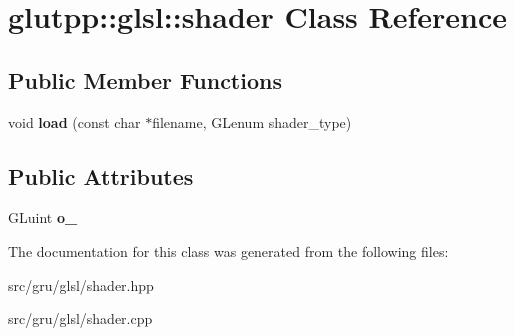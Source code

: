 \hypertarget{classglutpp_1_1glsl_1_1shader}{\section{glutpp\-:\-:glsl\-:\-:shader \-Class \-Reference}
\label{classglutpp_1_1glsl_1_1shader}
}
\subsection*{\-Public \-Member \-Functions}
\begin{DoxyCompactItemize}
\item 
\hypertarget{classglutpp_1_1glsl_1_1shader_a661319769ee74bc8ee182f00083c80ac}{void {\bfseries load} (const char $\ast$filename, \-G\-Lenum shader\-\_\-type)}\label{classglutpp_1_1glsl_1_1shader_a661319769ee74bc8ee182f00083c80ac}

\end{DoxyCompactItemize}
\subsection*{\-Public \-Attributes}
\begin{DoxyCompactItemize}
\item 
\hypertarget{classglutpp_1_1glsl_1_1shader_ad8049417565860b1b5d51171c6ace8dd}{\-G\-Luint {\bfseries o\-\_\-}}\label{classglutpp_1_1glsl_1_1shader_ad8049417565860b1b5d51171c6ace8dd}

\end{DoxyCompactItemize}


\-The documentation for this class was generated from the following files\-:\begin{DoxyCompactItemize}
\item 
src/gru/glsl/shader.\-hpp\item 
src/gru/glsl/shader.\-cpp\end{DoxyCompactItemize}
